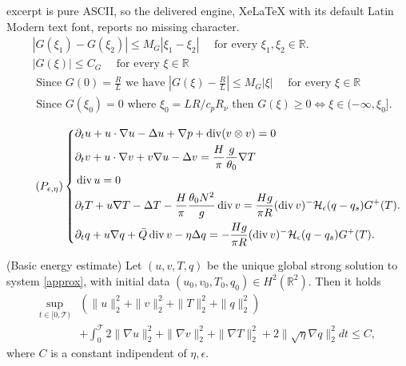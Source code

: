\documentclass[10pt,a4paper]{amsart}
\DeclareMathOperator{\dive}{div}
\begin{document}
excerpt is pure ASCII, so the delivered engine, XeLaTeX with its default Latin Modern text font, reports no missing character.
    \begin{align}\label{prop_G}
    & |G(\xi_1)-G(\xi_2)|\leq M_G |\xi_1 -\xi_2| \quad \text{ for every }\xi_1,\xi_2 \in \mathbb{R}. \\
    &|G(\xi)| \leq C_G \quad \text{ for every }  \xi \in \mathbb{R}  \nonumber \\
    & \text{ Since } G(0)=\frac{R}{L} \text{ we have } \left |G(\xi) - \frac{R}{L}\right | \leq M_G|\xi| \quad \text{ for every } \xi \in \mathbb{R}  \nonumber \\
   & \text{ Since } G(\xi_0) = 0 \text{ where } \xi_0 = LR/c_pR_\nu \text{ then } G(\xi) \geq 0 \Longleftrightarrow \xi \in (- \infty, \xi_0]  \nonumber.
\end{align}

\begin{equation}\label{approx}\tag{$P_{\epsilon,\eta}$}
\left\{\begin{aligned}
&\partial_t u + u \cdot \nabla u - \Delta u + \nabla p + \dive (v \otimes v) = 0\\
& \partial_ t v + u \cdot \nabla v + v \nabla u - \Delta v = \frac{H}{\pi} \frac{g}{\theta_0} \nabla T \\
& \dive u = 0 \\
& \partial_t T + u \nabla T - \Delta T - \frac{H}{\pi}\frac{\theta_0 N^2}{g}  \dive v = \frac{H g}{\pi R}(\dive v)^- \mathcal{H}_\epsilon(q-q_s) G^+(T). \\
& \partial_t q + u \nabla q + \bar{Q} \dive v - \eta \Delta q = -  \frac{H g}{\pi R}(\dive v)^- \mathcal{H}_\epsilon(q-q_s) G^+(T). 
    \end{aligned}\right.
\end{equation}

\begin{proposition}(Basic energy estimate)\label{1ene}
 Let $(u,v,T,q)$ be the unique global strong solution to system \eqref{approx}, with initial data $(u_0,v_0,T_{0},q_0) \in H^2(\mathbb{R}^2)$. Then it holds
\begin{equation}\label{energy_approx}
    \begin{aligned}
        \sup_{t \in [0, \mathcal{T})} & \left(\|u\|_2^2 + \|v\|_2^2 +  \|T\|_2^2 + \|q\|_2^2 \right)  \\
        & + \int_0^{\mathcal{T}} 2\|\nabla u\|_2^2 + \|\nabla v\|_2^2 + \|\nabla T\|_2^2 + 2\|\sqrt{\eta} \nabla q\|_2^2 dt \leq C, 
    \end{aligned}
\end{equation}
where $C$ is a constant indipendent of $\eta, \epsilon$.
\end{proposition}
\end{document}
